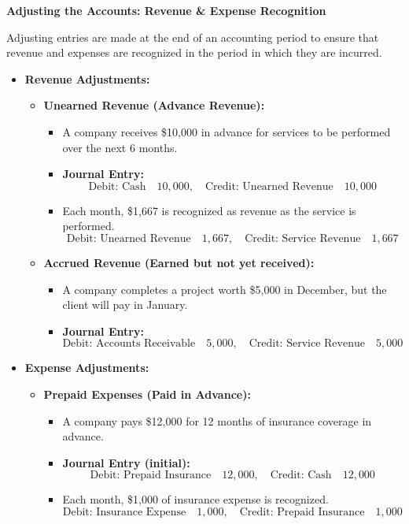 \documentclass[12pt,a4paper]{book}
\begin{document}
\vspace{0.5cm}
\textbf{Adjusting the Accounts: Revenue \& Expense Recognition}

Adjusting entries are made at the end of an accounting period to ensure that revenue and expenses are recognized in the period in which they are incurred.

\begin{itemize}
    \item \textbf{Revenue Adjustments:}
    \begin{itemize}
        \item \textbf{Unearned Revenue (Advance Revenue):}
        \begin{itemize}
            \item A company receives \$10,000 in advance for services to be performed over the next 6 months.
            \item \textbf{Journal Entry:}
            \[
            \text{Debit: Cash} \quad 10,000, \quad \text{Credit: Unearned Revenue} \quad 10,000
            \]
            \item Each month, \$1,667 is recognized as revenue as the service is performed.
            \[
            \text{Debit: Unearned Revenue} \quad 1,667, \quad \text{Credit: Service Revenue} \quad 1,667
            \]
        \end{itemize}
        
        \item \textbf{Accrued Revenue (Earned but not yet received):}
        \begin{itemize}
            \item A company completes a project worth \$5,000 in December, but the client will pay in January.
            \item \textbf{Journal Entry:}
            \[
            \text{Debit: Accounts Receivable} \quad 5,000, \quad \text{Credit: Service Revenue} \quad 5,000
            \]
        \end{itemize}
    \end{itemize}

    \item \textbf{Expense Adjustments:}
    \begin{itemize}
        \item \textbf{Prepaid Expenses (Paid in Advance):}
        \begin{itemize}
            \item A company pays \$12,000 for 12 months of insurance coverage in advance.
            \item \textbf{Journal Entry (initial):}
            \[
            \text{Debit: Prepaid Insurance} \quad 12,000, \quad \text{Credit: Cash} \quad 12,000
            \]
            \item Each month, \$1,000 of insurance expense is recognized.
            \[
            \text{Debit: Insurance Expense} \quad 1,000, \quad \text{Credit: Prepaid Insurance} \quad 1,000
            \]
        \end{itemize}
        

\end{itemize}
\end{itemize}
\end{document}
